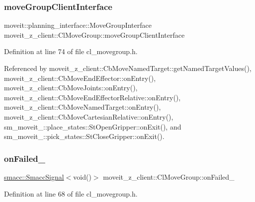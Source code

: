 \subsubsection{\texorpdfstring{move\+Group\+Client\+Interface}{moveGroupClientInterface}}
{\footnotesize\ttfamily moveit\+::planning\+\_\+interface\+::\+Move\+Group\+Interface moveit\+\_\+z\+\_\+client\+::\+Cl\+Move\+Group\+::move\+Group\+Client\+Interface}



Definition at line 74 of file cl\+\_\+movegroup.\+h.



Referenced by moveit\+\_\+z\+\_\+client\+::\+Cb\+Move\+Named\+Target\+::get\+Named\+Target\+Values(), moveit\+\_\+z\+\_\+client\+::\+Cb\+Move\+End\+Effector\+::on\+Entry(), moveit\+\_\+z\+\_\+client\+::\+Cb\+Move\+Joints\+::on\+Entry(), moveit\+\_\+z\+\_\+client\+::\+Cb\+Move\+End\+Effector\+Relative\+::on\+Entry(), moveit\+\_\+z\+\_\+client\+::\+Cb\+Move\+Named\+Target\+::on\+Entry(), moveit\+\_\+z\+\_\+client\+::\+Cb\+Move\+Cartesian\+Relative\+::on\+Entry(), sm\+\_\+moveit\+\_\+::place\+\_\+states\+::\+St\+Open\+Gripper\+::on\+Exit(), and sm\+\_\+moveit\+\_\+::pick\+\_\+states\+::\+St\+Close\+Gripper\+::on\+Exit().

\mbox{\label{classmoveit__z__client_1_1ClMoveGroup_ab9f19c609cfa111748bc16d497dffe9a}} 
\subsubsection{\texorpdfstring{on\+Failed\+\_\+}{onFailed\_}}
{\footnotesize\ttfamily \hyperlink{classsmacc_1_1SmaccSignal}{smacc\+::\+Smacc\+Signal}$<$void()$>$ moveit\+\_\+z\+\_\+client\+::\+Cl\+Move\+Group\+::on\+Failed\+\_\+\hspace{0.3cm}{\ttfamily [private]}}



Definition at line 68 of file cl\+\_\+movegroup.\+h.

\mbox{\label{classmoveit__z__client_1_1ClMoveGroup_a77804970cc1e2ae64e26dabbf556352d}} 

